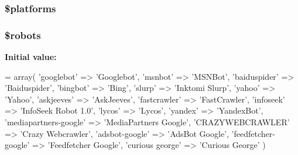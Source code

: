 \subsubsection[{\$platforms}]{\setlength{\rightskip}{0pt plus 5cm}\$platforms}\label{user__agents_8php_a1c1a0a860242698ee6b3f4ef7d6eb343}
\hypertarget{user__agents_8php_a5752e2a66d1c03bc34666492746037ab}{}
\subsubsection[{\$robots}]{\setlength{\rightskip}{0pt plus 5cm}\$robots}\label{user__agents_8php_a5752e2a66d1c03bc34666492746037ab}
{\bfseries Initial value\+:}
\begin{DoxyCode}
= array(
    \textcolor{stringliteral}{'googlebot'}     => \textcolor{stringliteral}{'Googlebot'},
    \textcolor{stringliteral}{'msnbot'}        => \textcolor{stringliteral}{'MSNBot'},
    \textcolor{stringliteral}{'baiduspider'}       => \textcolor{stringliteral}{'Baiduspider'},
    \textcolor{stringliteral}{'bingbot'}       => \textcolor{stringliteral}{'Bing'},
    \textcolor{stringliteral}{'slurp'}         => \textcolor{stringliteral}{'Inktomi Slurp'},
    \textcolor{stringliteral}{'yahoo'}         => \textcolor{stringliteral}{'Yahoo'},
    \textcolor{stringliteral}{'askjeeves'}     => \textcolor{stringliteral}{'AskJeeves'},
    \textcolor{stringliteral}{'fastcrawler'}       => \textcolor{stringliteral}{'FastCrawler'},
    \textcolor{stringliteral}{'infoseek'}      => \textcolor{stringliteral}{'InfoSeek Robot 1.0'},
    \textcolor{stringliteral}{'lycos'}         => \textcolor{stringliteral}{'Lycos'},
    \textcolor{stringliteral}{'yandex'}        => \textcolor{stringliteral}{'YandexBot'},
    \textcolor{stringliteral}{'mediapartners-google'}  => \textcolor{stringliteral}{'MediaPartners Google'},
    \textcolor{stringliteral}{'CRAZYWEBCRAWLER'}   => \textcolor{stringliteral}{'Crazy Webcrawler'},
    \textcolor{stringliteral}{'adsbot-google'}     => \textcolor{stringliteral}{'AdsBot Google'},
    \textcolor{stringliteral}{'feedfetcher-google'}    => \textcolor{stringliteral}{'Feedfetcher Google'},
    \textcolor{stringliteral}{'curious george'}    => \textcolor{stringliteral}{'Curious George'}
)
\end{DoxyCode}
